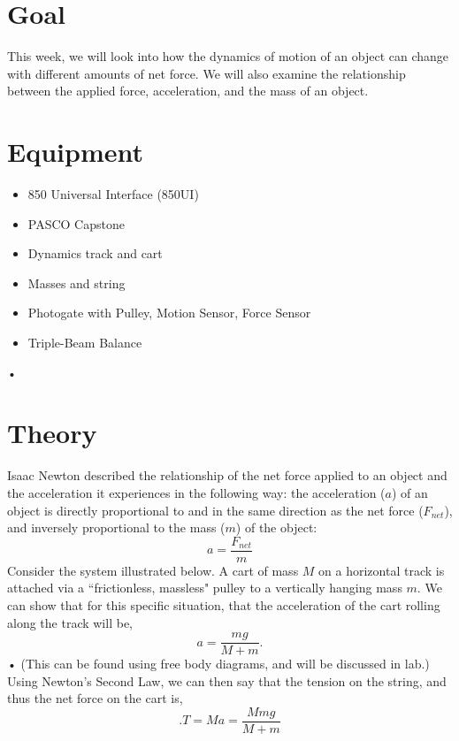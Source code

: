 \documentclass[main.tex]{subfiles}
\begin{document}
\label{chap:Force}

\section*{Goal}
This week, we will look into how the dynamics of motion of an object can change with different amounts of net force. We will also examine the relationship between the applied force, acceleration, and the mass of an object.

\section*{Equipment}
\begin{itemize}
\item
850 Universal Interface (850UI)
\item
PASCO Capstone
\item
Dynamics track and cart
\item
Masses and string
\item
Photogate with Pulley, Motion Sensor, Force Sensor
\item
Triple-Beam Balance
\end{itemize}•

\section*{Theory}
Isaac Newton described the relationship of the net force applied to an object and the acceleration it experiences in the following way: the acceleration ($a$) of an object is directly proportional to and in the same direction as the net force ($F_{net}$), and inversely proportional to the mass ($m$) of the object:
\begin{equation} \label{eq:Law2}
a=\frac{F_{net}}{m}
\end{equation}
Consider the system illustrated below. A cart of mass $M$ on a horizontal track is attached via a ``frictionless, massless" pulley to a vertically hanging mass $m.$ We can show that for this specific situation, that the acceleration of the cart rolling along the track will be,
\begin{equation} \label{eq:acc_cart}
a=\frac{mg}{M+m}.
\end{equation}•
(This can be found using free body diagrams, and will be discussed in lab.) Using Newton's Second Law, we can then say that the tension on the string, and thus the net force on the cart is,
\begin{equation} \label{eq:F_cart}.
T=Ma=\frac{Mmg}{M+m}
\end{equation}
\end{document}

